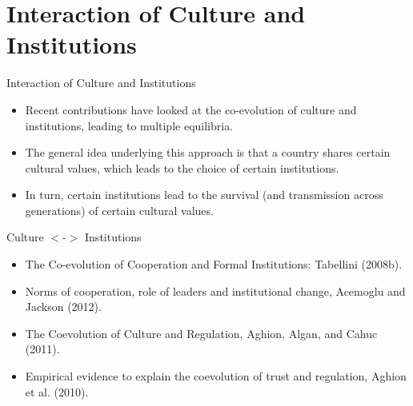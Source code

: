\documentclass{beamer}
\begin{document}
\section{Interaction of Culture and Institutions}
\begin{frame}{Interaction of Culture and Institutions}
    

\begin{itemize}
    \item Recent contributions have looked at the co-evolution of culture and  institutions, leading to multiple equilibria.
                \vspace{0.3cm}
        \pause 
    
\item  The general idea underlying this approach is that a country shares certain cultural values, which leads to the choice of certain institutions. 

                \vspace{0.3cm}
        \pause 
        \item In turn, certain institutions lead to the survival (and transmission across generations) of certain cultural values.


\end{itemize}
\end{frame}

\begin{frame}{Culture $<$-$>$ Institutions  }

\begin{itemize}
    \item The Co-evolution of Cooperation and Formal Institutions: Tabellini (2008b).
    \pause 
    \item  Norms of cooperation, role of leaders and institutional change,  Acemoglu and Jackson (2012).
    \pause
    \item The Coevolution of Culture and Regulation, Aghion, Algan, and Cahuc (2011).
    \pause
    \item   Empirical evidence to explain the coevolution of trust and regulation, Aghion et al. (2010).
\end{itemize}
    
\end{frame}
\end{document}
